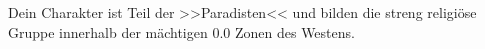 Dein Charakter ist Teil der >>Paradisten<< und bilden die streng religiöse
Gruppe innerhalb der mächtigen 0.0 Zonen des Westens. 
